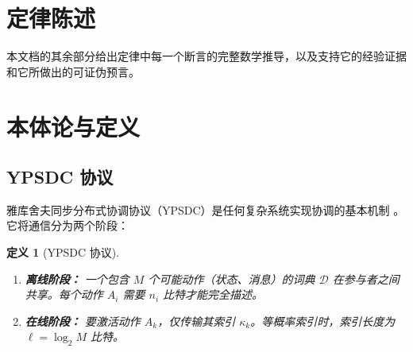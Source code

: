 \documentclass[12pt,a4paper]{article}
\newtheorem{definition}[theorem]{定义}
\theoremstyle{remark}
\begin{document}
	\tableofcontents
	\newpage
	
	\section{定律陈述}
	\label{sec:statement}
	
	\begin{center}
	\end{center}
	
	本文档的其余部分给出定律中每一个断言的完整数学推导，以及支持它的经验证据和它所做出的可证伪预言。
	
	\section{本体论与定义}
	\label{sec:ontology}
	
	\subsection{YPSDC 协议}
	
	雅库舍夫同步分布式协调协议（YPSDC）是任何复杂系统实现协调的基本机制 \cite{Yakushev2026a, AppendixB}。它将通信分为两个阶段：
	
	\begin{definition}[YPSDC 协议]
		\begin{enumerate}[label=(\roman*)]
			\item \textbf{离线阶段：} 一个包含 \(M\) 个可能动作（状态、消息）的词典 \(\mathcal{D}\) 在参与者之间共享。每个动作 \(A_i\) 需要 \(n_i\) 比特才能完全描述。
			\item \textbf{在线阶段：} 要激活动作 \(A_k\)，仅传输其索引 \(\kappa_k\)。等概率索引时，索引长度为 \(\ell = \log_2 M\) 比特。
		\end{enumerate}
	\end{definition}
	
\end{document}

